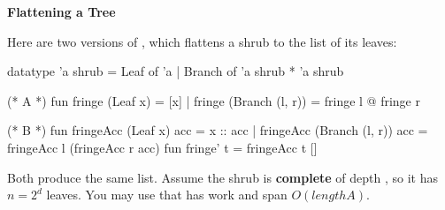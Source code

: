 \newpage
{}

\textbf{Flattening a Tree}

Here are two versions of , which flattens a shrub to the list of its
leaves:
\begin{codeblock}
  datatype 'a shrub = Leaf of 'a | Branch of 'a shrub * 'a shrub

  (* A *)
  fun fringe (Leaf x)      = [x]
    | fringe (Branch (l, r)) = fringe l @ fringe r

  (* B *)
  fun fringeAcc (Leaf x) acc      = x :: acc
    | fringeAcc (Branch (l, r)) acc = fringeAcc l (fringeAcc r acc)
  fun fringe' t = fringeAcc t []
\end{codeblock}

Both produce the same list. Assume the shrub is \textbf{complete} of depth
, so it has $n = 2^d$ leaves. You may use that  has work and
span $O(length A)$.

